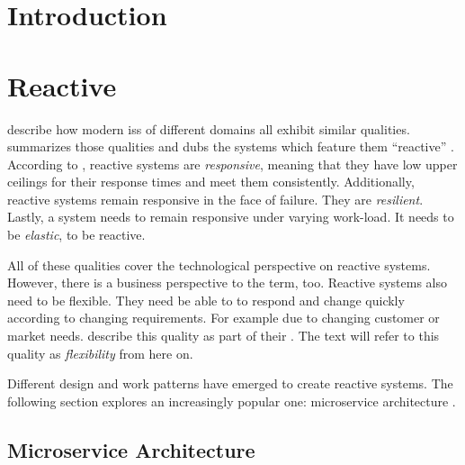 
\section{Introduction}\label{sec:introduction}

\section{Reactive }

\citeauthor{boner_reactive_2014} describe how modern \glspl{is} of different domains all exhibit similar qualities.
 summarizes those qualities and dubs the systems which feature them \enquote{reactive} \parencite{boner_reactive_2014}.
According to \cite{boner_reactive_2014}, reactive systems are \emph{responsive}, meaning that they have low upper ceilings for their response times and meet them consistently.
Additionally, reactive systems remain responsive in the face of failure.
They are \emph{resilient}.
Lastly, a system needs to remain responsive under varying work-load.
It needs to be \emph{elastic}, to be reactive.

All of these qualities cover the technological perspective on reactive systems.
However, there is a business perspective to the term, too.
Reactive systems also need to be flexible.
They need be able to to respond and change quickly according to changing requirements.
For example due to changing customer or market needs.
\citeauthor{beck2001agile} describe this quality as part of their  \parencite{beck2001agile}.
The text will refer to this quality as \emph{flexibility} from here on.

Different design and work patterns have emerged to create reactive systems.
The following section explores an increasingly popular one: microservice architecture \parencite{loukides_microservice_adoption_2020}.

\subsection{Microservice Architecture}

